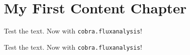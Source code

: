 \chapter{My First Content Chapter}
\label{chapterlabel2}

\blindtext


Test the text. Now with \texttt{cobra.flux\textunderscore analysis}!



Test the text. Now with \texttt{cobra.flux\textunderscore analysis}!